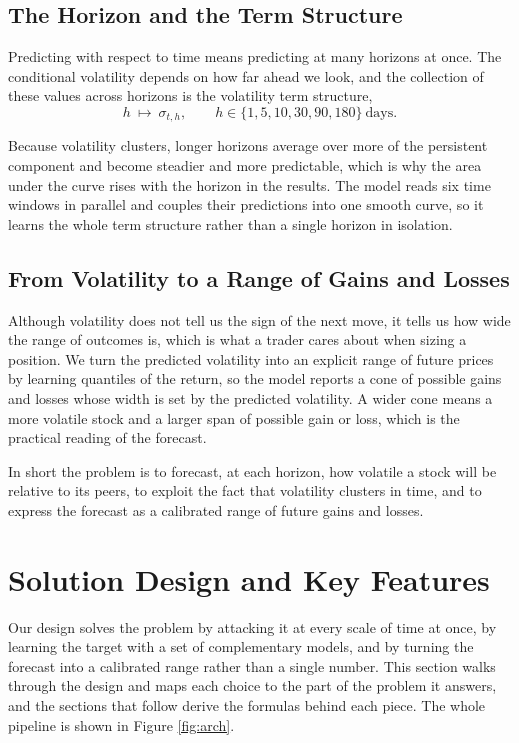 \documentclass[12pt,letterpaper]{article}
\begin{document}
\subsection{The Horizon and the Term Structure}

Predicting with respect to time means predicting at many horizons at once. The
conditional volatility depends on how far ahead we look, and the collection of
these values across horizons is the volatility term structure,
\[
h \ \longmapsto\ \sigma_{t,h},
\qquad h \in \{1, 5, 10, 30, 90, 180\}\ \text{days} .
\]

Because volatility clusters, longer horizons average over more of the persistent
component and become steadier and more predictable, which is why the area under
the curve rises with the horizon in the results. The model reads six time
windows in parallel and couples their predictions into one smooth curve, so it
learns the whole term structure rather than a single horizon in isolation.

\subsection{From Volatility to a Range of Gains and Losses}

Although volatility does not tell us the sign of the next move, it tells us how
wide the range of outcomes is, which is what a trader cares about when sizing a
position. We turn the predicted volatility into an explicit range of future
prices by learning quantiles of the return, so the model reports a cone of
possible gains and losses whose width is set by the predicted volatility. A wider
cone means a more volatile stock and a larger span of possible gain or loss,
which is the practical reading of the forecast.

In short the problem is to forecast, at each horizon, how volatile a stock will
be relative to its peers, to exploit the fact that volatility clusters in time,
and to express the forecast as a calibrated range of future gains and losses.

\clearpage
\section{Solution Design and Key Features}

Our design solves the problem by attacking it at every scale of time at once,
by learning the target with a set of complementary models, and by turning the
forecast into a calibrated range rather than a single number. This section walks
through the design and maps each choice to the part of the problem it answers,
and the sections that follow derive the formulas behind each piece. The whole
pipeline is shown in Figure \ref{fig:arch}.
\end{document}
